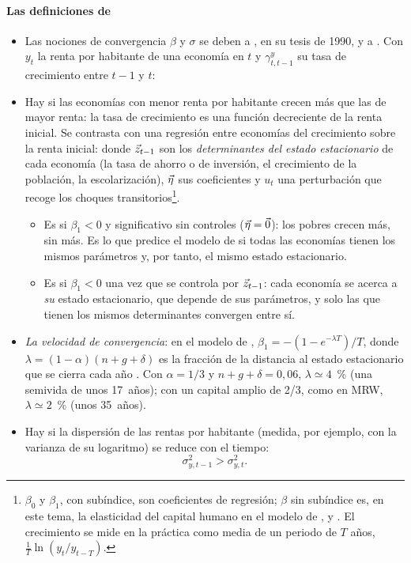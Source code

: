 \documentclass[11pt]{article}
\begin{document}
\paragraph{Las definiciones de }

\begin{itemize}
\item Las nociones de convergencia $\beta$ y $\sigma$ se deben a , en su tesis de 1990, y a \textcite{BarroSalaiMartin1991}. Con $y_{t}$ la renta por habitante de una economía en $t$ y $\gamma^{y}_{t,t-1}$ su tasa de crecimiento entre $t-1$ y $t$:
\item Hay  si las economías con menor renta por habitante crecen más que las de mayor renta: la tasa de crecimiento es una función decreciente de la renta inicial. Se contrasta con una regresión entre economías del crecimiento sobre la renta inicial:
  donde $\vec{z}_{t-1}$ son los \emph{determinantes del estado estacionario} de cada economía (la tasa de ahorro o de inversión, el crecimiento de la población, la escolarización), $\vec{\eta}$ sus coeficientes y $u_t$ una perturbación que recoge los choques transitorios\footnote{$\beta_0$ y $\beta_1$, con subíndice, son coeficientes de regresión; $\beta$ sin subíndice es, en este tema, la elasticidad del capital humano en el modelo de ,  y . El crecimiento se mide en la práctica como media de un periodo de $T$ años, $\frac1T\ln(y_t/y_{t-T})$.}.
  \begin{itemize}
  \item Es  si $\beta_1<0$ y significativo sin controles ($\vec{\eta}=\vec{0}$): los pobres crecen más, sin más. Es lo que predice el modelo de  si todas las economías tienen los mismos parámetros y, por tanto, el mismo estado estacionario.
  \item Es  si $\beta_1<0$ una vez que se controla por $\vec{z}_{t-1}$: cada economía se acerca a \emph{su} estado estacionario, que depende de sus parámetros, y solo las que tienen los mismos determinantes convergen entre sí.
  \end{itemize}
\item \emph{La velocidad de convergencia}: en el modelo de , $\beta_1=-(1-e^{-\lambda T})/T$, donde $\lambda=(1-\alpha)(n+g+\delta)$ es la fracción de la distancia al estado estacionario que se cierra cada año . Con $\alpha=1/3$ y $n+g+\delta=0{,}06$, $\lambda\simeq4$~\% (una semivida de unos 17~años); con un capital amplio de 2/3, como en MRW, $\lambda\simeq2$~\% (unos 35~años).
\item Hay  si la dispersión de las rentas por habitante (medida, por ejemplo, con la varianza de su logaritmo) se reduce con el tiempo:
  \begin{equation}
  \sigma^{2}_{y,t-1}>\sigma^{2}_{y,t} .\label{eq:convergencia-sigma}
  \end{equation}
\end{itemize}
\end{document}
